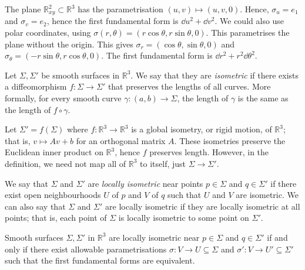 \begin{example}
	The plane \( \mathbb R^2_{xy} \subset \mathbb R^3 \) has the parametrisation \( (u,v) \mapsto (u,v,0) \).
	Hence, \( \sigma_u = e_1 \) and \( \sigma_v = e_2 \), hence the first fundamental form is \( \dd{u}^2 + \dd{v}^2 \).
	We could also use polar coordinates, using \( \sigma(r,\theta) = (r\cos\theta,r\sin\theta,0) \).
	This parametrises the plane without the origin.
	This gives \( \sigma_r = (\cos\theta,\sin\theta,0) \) and \( \sigma_\theta = (-r\sin\theta, r\cos\theta,0) \).
	The first fundamental form is \( \dd{r}^2 + r^2 \dd{\theta}^2 \).
\end{example}
\begin{definition}
	Let \( \Sigma, \Sigma' \) be smooth surfaces in \( \mathbb R^3 \).
	We say that they are \textit{isometric} if there exists a diffeomorphism \( f\colon \Sigma \to \Sigma' \) that preserves the lengths of all curves.
	More formally, for every smooth curve \( \gamma \colon (a,b) \to \Sigma \), the length of \( \gamma \) is the same as the length of \( f \circ \gamma \).
\end{definition}
\begin{example}
	Let \( \Sigma' = f(\Sigma) \) where \( f \colon \mathbb R^3 \to \mathbb R^3 \) is a global isometry, or rigid motion, of \( \mathbb R^3 \); that is, \( v \mapsto Av+b \) for an orthogonal matrix \( A \).
	These isometries preserve the Euclidean inner product on \( \mathbb R^3 \), hence \( f \) preserves length.
	However, in the definition, we need not map all of \( \mathbb R^3 \) to itself, just \( \Sigma \to \Sigma' \).
\end{example}
\begin{definition}
	We say that \( \Sigma \) and \( \Sigma' \) are \textit{locally isometric} near points \( p \in \Sigma \) and \( q \in \Sigma' \) if there exist open neighbourhoods \( U \) of \( p \) and \( V \) of \( q \) such that \( U \) and \( V \) are isometric.
	We can also say that \( \Sigma \) and \( \Sigma' \) are locally isometric if they are locally isometric at all points; that is, each point of \( \Sigma \) is locally isometric to some point on \( \Sigma' \).
\end{definition}
\begin{lemma}
	Smooth surfaces \( \Sigma, \Sigma' \) in \( \mathbb R^3 \) are locally isometric near \( p \in \Sigma \) and \( q \in \Sigma' \) if and only if there exist allowable parametrisations \( \sigma \colon V \to U \subseteq \Sigma \) and \( \sigma' \colon V \to U' \subseteq \Sigma' \) such that the first fundamental forms are equivalent.
\end{lemma}
